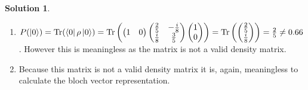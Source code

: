 \documentclass[10pt]{article}
\theoremstyle{definition}
\newtheorem{soln}{Solution}
\begin{document}
\begin{soln}
\begin{enumerate}[label=(\alph*)]
\begin{enumerate}[label=(\Alph*)]
            \item $P(\ket{0})=\mathrm{Tr}(\bra{0}\rho\ket{0})=\mathrm{Tr}\left(\begin{pmatrix}
                        1 &
                        0
                      \end{pmatrix}\begin{pmatrix}
                        \frac{2}{5} & -\frac{i}{8} \\
                        \frac{i}{8} & \frac{3}{5}
                      \end{pmatrix}
                    \begin{pmatrix}
                        1 \\
                        0
                      \end{pmatrix}\right)=
                    \mathrm{Tr}\left(\begin{pmatrix}
                        \frac{2}{5} \\
                        \frac{i}{8}
                      \end{pmatrix}\right)=\frac{2}{5}\neq 0.66$. However this is meaningless as the matrix is not a valid density matrix.
            \item Because this matrix is not a valid density matrix it is, again, meaningless to calculate the bloch vector representation.
          \end{enumerate}
  \end{enumerate}
\end{soln}
\end{document}
